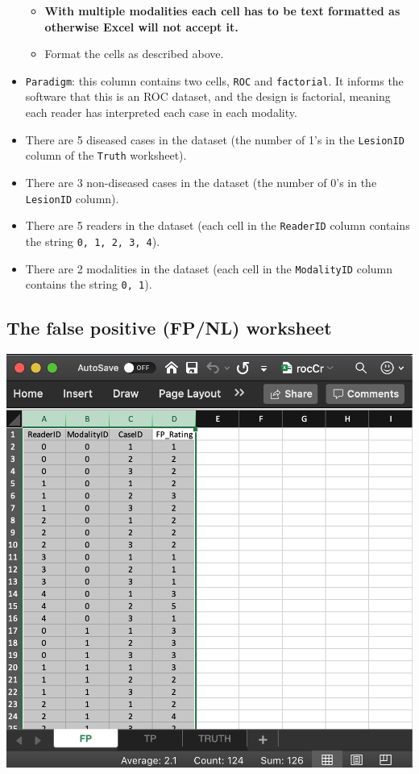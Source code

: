 \documentclass[
]{book}
\providecommand{\tightlist}{%
  \setlength{\itemsep}{0pt}\setlength{\parskip}{0pt}}
\begin{document}
\begin{itemize}
  \begin{itemize}
  \tightlist
  \item
    \textbf{With multiple modalities each cell has to be text formatted as otherwise Excel will not accept it.}
  \item
    Format the cells as described above.
  \end{itemize}
\item
  \texttt{Paradigm}: this column contains two cells, \texttt{ROC} and \texttt{factorial}. It informs the software that this is an ROC dataset, and the design is factorial, meaning each reader has interpreted each case in each modality.
\item
  There are 5 diseased cases in the dataset (the number of 1's in the \texttt{LesionID} column of the \texttt{Truth} worksheet).
\item
  There are 3 non-diseased cases in the dataset (the number of 0's in the \texttt{LesionID} column).
\item
  There are 5 readers in the dataset (each cell in the \texttt{ReaderID} column contains the string \texttt{0,\ 1,\ 2,\ 3,\ 4}).
\item
  There are 2 modalities in the dataset (each cell in the \texttt{ModalityID} column contains the string \texttt{0,\ 1}).
\end{itemize}

\hypertarget{quick-start-roc-fp}{%
\subsection{The false positive (FP/NL) worksheet}\label{quick-start-roc-fp}}

\includegraphics[width=1\textwidth,height=\textheight]{images/quick-start/rocCrFp.png}
\end{document}
